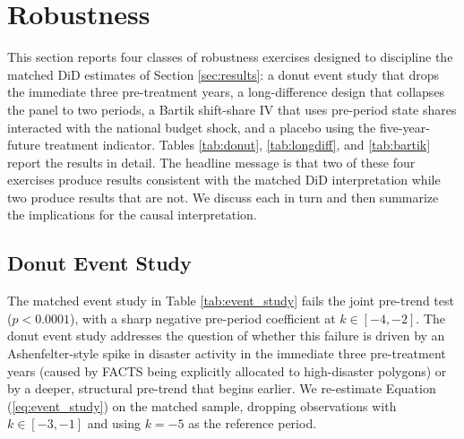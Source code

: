 \documentclass[12pt, letterpaper]{article}
\begin{document}
\section{Robustness}\label{sec:robust}

This section reports four classes of robustness exercises designed to discipline the matched DiD estimates of Section \ref{sec:results}: a donut event study that drops the immediate three pre-treatment years, a long-difference design that collapses the panel to two periods, a Bartik shift-share IV that uses pre-period state shares interacted with the national budget shock, and a placebo using the five-year-future treatment indicator. Tables \ref{tab:donut}, \ref{tab:longdiff}, and \ref{tab:bartik} report the results in detail. The headline message is that two of these four exercises produce results consistent with the matched DiD interpretation while two produce results that are not. We discuss each in turn and then summarize the implications for the causal interpretation.

\subsection{Donut Event Study}\label{sec:donut}

The matched event study in Table \ref{tab:event_study} fails the joint pre-trend test ($p < 0.0001$), with a sharp negative pre-period coefficient at $k \in [-4, -2]$. The donut event study addresses the question of whether this failure is driven by an Ashenfelter-style spike in disaster activity in the immediate three pre-treatment years (caused by FACTS being explicitly allocated to high-disaster polygons) or by a deeper, structural pre-trend that begins earlier. We re-estimate Equation (\ref{eq:event_study}) on the matched sample, dropping observations with $k \in [-3, -1]$ and using $k = -5$ as the reference period.
\end{document}
